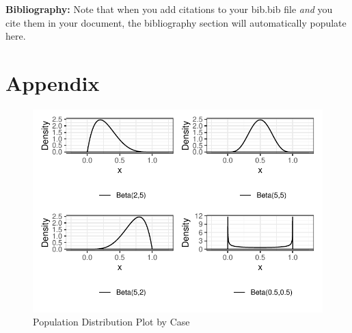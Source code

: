 \documentclass{article}\usepackage[]{graphicx}\usepackage[]{xcolor}
\makeatletter
\def\maxwidth{ %
  \ifdim\Gin@nat@width>\linewidth
    \linewidth
  \else
    \Gin@nat@width
  \fi
}
\newenvironment{knitrout}{}{} %
\makeatother
\begin{document}
\begin{multicols}{2}
\vspace{2em}

\noindent\textbf{Bibliography:} Note that when you add citations to your bib.bib file \emph{and}
you cite them in your document, the bibliography section will automatically populate here.

\begin{tiny}

\end{tiny}
\end{multicols}

\newpage
\onecolumn
\section{Appendix}

\begin{figure}[H]
\begin{center}
\begin{knitrout}
\color{fgcolor}
\includegraphics[width=\maxwidth]{figure/unnamed-chunk-3-1} 
\end{knitrout}
\caption{Population Distribution Plot by Case}
\label{plot1} 
\end{center}
\end{figure}
\end{document}
